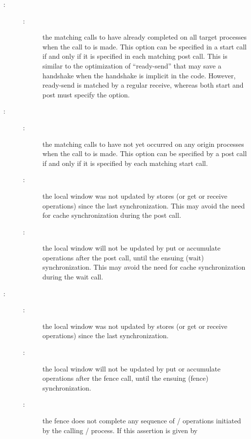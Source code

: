 \begin{description}
\item[:]\quad
\begin{description}
\item[:]the
matching calls to  have
already completed on all target processes when the call to
 is made.
This option can be
specified in a start call if and only if it is specified in each
matching post call.
This is similar to the optimization
of ``ready-send'' that may save a handshake when the handshake is
implicit in the code.
However, ready-send is matched by a regular receive, whereas
both start and post must specify the  option.
\end{description}
\item[:]\quad
\begin{description}
\item[:]the
matching calls to 
have not yet occurred
on any origin processes when the call to
 is made.
This option can be specified by a post call if and only if it
is specified by each matching start call.
\item[:]the
local window was not updated by
stores (or get or receive operations) since the
last synchronization.  This may avoid
the need for cache synchronization during the post call.
\item[:]the
local window will not be updated by
put or accumulate
operations after the post call, until the ensuing (wait) synchronization.
This may avoid the need for cache synchronization during the wait call.
\end{description}
\item[:]\quad
\begin{description}
\item[:]the
local window was not updated by
stores (or get or receive operations) since the last synchronization.
\item[:]the
local window will not be updated
by put or accumulate operations after
the fence call, until the ensuing (fence) synchronization.
\item[:]the
fence does not complete any
sequence of \RMA/ operations initiated by the calling \mpi/ process.  If this assertion is given by

\end{description}
\end{description}
